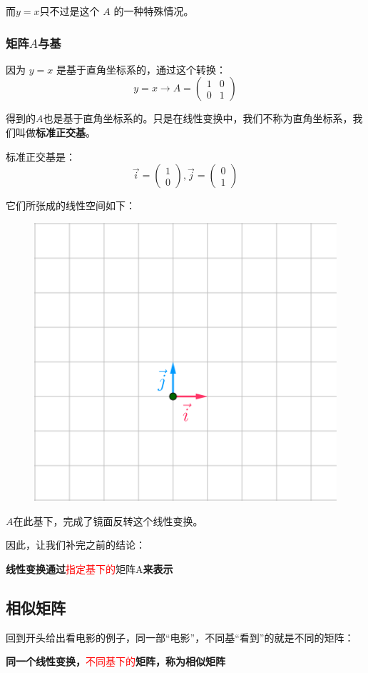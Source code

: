 \documentclass[12pt]{article}
\begin{document}
而$y=x$只不过是这个 $A$ 的一种特殊情况。

\subsubsection{矩阵$A$与基}
因为 $y=x$ 是基于直角坐标系的，通过这个转换：
$$
y = x \rightarrow A = \begin{pmatrix}
1&0 \\ 0&1
\end{pmatrix}
$$

得到的$A$也是基于直角坐标系的。只是在线性变换中，我们不称为直角坐标系，我们叫做\textbf{标准正交基}。

标准正交基是：
$$
\vec{i} = \begin{pmatrix}1\\0\end{pmatrix}, \vec{j} = \begin{pmatrix}0\\1\end{pmatrix}
$$

它们所张成的线性空间如下：
\begin{figure}[H]
\centering
\includegraphics[width=.5\textwidth]{fig/UnderstandSimilarMatrix_2.png} 
\end{figure}

$A$在此基下，完成了镜面反转这个线性变换。

因此，让我们补完之前的结论：
\begin{center}
\textbf{线性变换通过}\textcolor{red}{指定基下的}{矩阵}A\textbf{来表示}
\end{center}

\subsection{相似矩阵}
回到开头给出看电影的例子，同一部“电影”，不同基“看到”的就是不同的矩阵：

\begin{center}
\textbf{同一个线性变换，}\textcolor{red}{不同基下的}\textbf{矩阵，称为相似矩阵}
\end{center}
\end{document}
